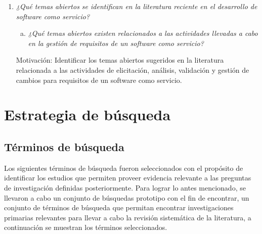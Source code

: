 \documentclass{article}
\begin{document}
\begin{enumerate}[P 1.-]
  \item\emph{¿Qué temas abiertos se identifican en la literatura reciente en el desarrollo de software como servicio?}
  \begin{enumerate}[(a)]
  \item \emph{¿Qué temas abiertos existen relacionados a las actividades llevadas a cabo en la gestión de requisitos de un software como servicio?}
  \end{enumerate}
  Motivación: Identificar los temas abiertos sugeridos en la literatura relacionada a las actividades de elicitación, análisis, validación y gestión de cambios 
 para requisitos de un software como servicio.
\end{enumerate}


\section{Estrategia de búsqueda}




\subsection{Términos de búsqueda}
Los siguientes términos de búsqueda fueron seleccionados con el propósito de identificar los estudios que 
permiten proveer evidencia relevante a las preguntas de investigación definidas posteriormente. 
Para lograr lo antes mencionado, se llevaron a cabo un conjunto de búsquedas prototipo con el fin de encontrar, 
un conjunto de términos de búsqueda que permitan encontrar investigaciones primarias relevantes para llevar a cabo
la revisión sistemática de la literatura, a continuación se muestran los términos seleccionados.
\end{document}
